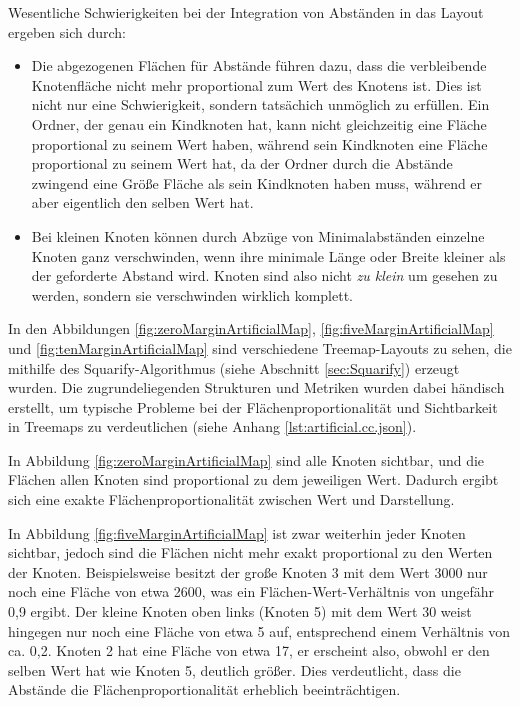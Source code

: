 Wesentliche Schwierigkeiten bei der Integration von Abständen in das Layout ergeben sich durch:
\begin{itemize}
    \item Die abgezogenen Flächen für Abstände führen dazu, dass die verbleibende Knotenfläche nicht mehr proportional zum Wert des Knotens ist. Dies ist nicht nur eine Schwierigkeit, sondern tatsächich unmöglich zu erfüllen. Ein Ordner, der genau ein Kindknoten hat, kann nicht gleichzeitig eine Fläche proportional zu seinem Wert haben, während sein Kindknoten eine Fläche proportional zu seinem Wert hat, da der Ordner durch die Abstände zwingend eine Größe Fläche als sein Kindknoten haben muss, während er aber eigentlich den selben Wert hat.
    \item Bei kleinen Knoten können durch Abzüge von Minimalabständen einzelne Knoten ganz verschwinden, wenn ihre minimale Länge oder Breite kleiner als der geforderte Abstand wird. Knoten sind also nicht \textit{zu klein} um gesehen zu werden, sondern sie verschwinden wirklich komplett.
\end{itemize}

In den Abbildungen \ref{fig:zeroMarginArtificialMap}, \ref{fig:fiveMarginArtificialMap} und \ref{fig:tenMarginArtificialMap} sind verschiedene Treemap-Layouts zu sehen, die mithilfe des Squarify-Algorithmus (siehe Abschnitt \ref{sec:Squarify}) erzeugt wurden. Die zugrundeliegenden Strukturen und Metriken wurden dabei händisch erstellt, um typische Probleme bei der Flächenproportionalität und Sichtbarkeit in Treemaps zu verdeutlichen (siehe Anhang \ref{lst:artificial.cc.json}).

In Abbildung \ref{fig:zeroMarginArtificialMap} sind alle Knoten sichtbar, und die Flächen allen Knoten sind proportional zu dem jeweiligen Wert. Dadurch ergibt sich eine exakte Flächenproportionalität zwischen Wert und Darstellung.

In Abbildung \ref{fig:fiveMarginArtificialMap} ist zwar weiterhin jeder Knoten sichtbar, jedoch sind die Flächen nicht mehr exakt proportional zu den Werten der Knoten. Beispielsweise besitzt der große Knoten 3 mit dem Wert 3000 nur noch eine Fläche von etwa 2600, was ein Flächen-Wert-Verhältnis von ungefähr 0,9 ergibt. Der kleine Knoten oben links (Knoten 5) mit dem Wert 30 weist hingegen nur noch eine Fläche von etwa 5 auf, entsprechend einem Verhältnis von ca. 0,2.  Knoten 2 hat eine Fläche von etwa 17, er erscheint also, obwohl er den selben Wert hat wie Knoten 5, deutlich größer. Dies verdeutlicht, dass die Abstände die Flächenproportionalität erheblich beeinträchtigen.

